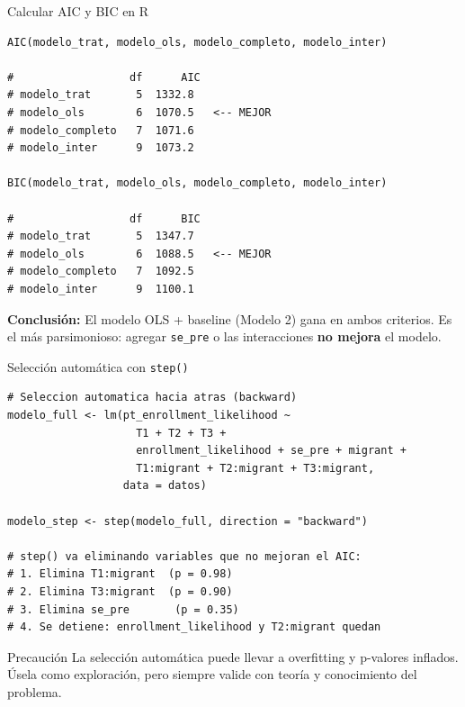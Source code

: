 \documentclass[aspectratio=169, 11pt]{beamer}
\begin{document}
\begin{frame}[fragile]{Calcular AIC y BIC en R}
\begin{lstlisting}[basicstyle=\ttfamily\scriptsize]
AIC(modelo_trat, modelo_ols, modelo_completo, modelo_inter)

#                  df      AIC
# modelo_trat       5  1332.8
# modelo_ols        6  1070.5   <-- MEJOR
# modelo_completo   7  1071.6
# modelo_inter      9  1073.2

BIC(modelo_trat, modelo_ols, modelo_completo, modelo_inter)

#                  df      BIC
# modelo_trat       5  1347.7
# modelo_ols        6  1088.5   <-- MEJOR
# modelo_completo   7  1092.5
# modelo_inter      9  1100.1
\end{lstlisting}

\vspace{0.2cm}
\textbf{Conclusión:} El modelo OLS + baseline (Modelo 2) gana en ambos criterios. Es el más parsimonioso: agregar \texttt{se\_pre} o las interacciones \textbf{no mejora} el modelo.
\end{frame}

\begin{frame}[fragile]{Selección automática con \texttt{step()}}
\begin{lstlisting}[basicstyle=\ttfamily\scriptsize]
# Seleccion automatica hacia atras (backward)
modelo_full <- lm(pt_enrollment_likelihood ~
                    T1 + T2 + T3 +
                    enrollment_likelihood + se_pre + migrant +
                    T1:migrant + T2:migrant + T3:migrant,
                  data = datos)

modelo_step <- step(modelo_full, direction = "backward")

# step() va eliminando variables que no mejoran el AIC:
# 1. Elimina T1:migrant  (p = 0.98)
# 2. Elimina T3:migrant  (p = 0.90)
# 3. Elimina se_pre       (p = 0.35)
# 4. Se detiene: enrollment_likelihood y T2:migrant quedan
\end{lstlisting}

\vspace{0.2cm}
\begin{alertblock}{Precaución}
La selección automática puede llevar a overfitting y p-valores inflados. Úsela como exploración, pero siempre valide con teoría y conocimiento del problema.
\end{alertblock}
\end{frame}

\end{document}
